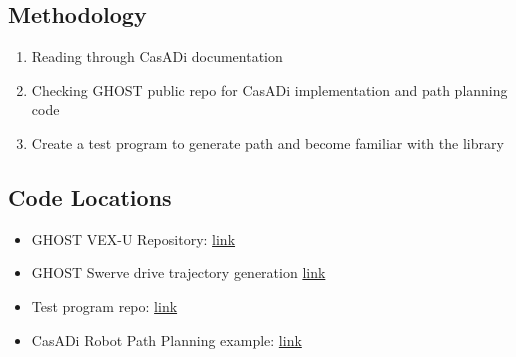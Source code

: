 \subsection*{Methodology}
\begin{enumerate}
    \item Reading through CasADi documentation
    \item Checking GHOST public repo for CasADi implementation and path planning code
    \item Create a test program to generate path and become familiar with the library
\end{enumerate}

\subsection*{Code Locations}
\begin{itemize}
    \item GHOST VEX-U Repository: \href{https://github.com/VEXU-GHOST/VEXU_GHOST}{link}
    \item GHOST Swerve drive trajectory generation \href{https://github.com/VEXU-GHOST/VEXU_GHOST/blob/develop/11_Robots/ghost_swerve_mpc_planner/src/casadi_swerve_model_generation.cpp}{link}
    \item Test program repo: \href{https://github.com/msoe-vex/CasADi-Test.git}{link}
    \item CasADi Robot Path Planning example: \href{https://github.com/tianchenji/path-planning.git}{link}
\end{itemize}

